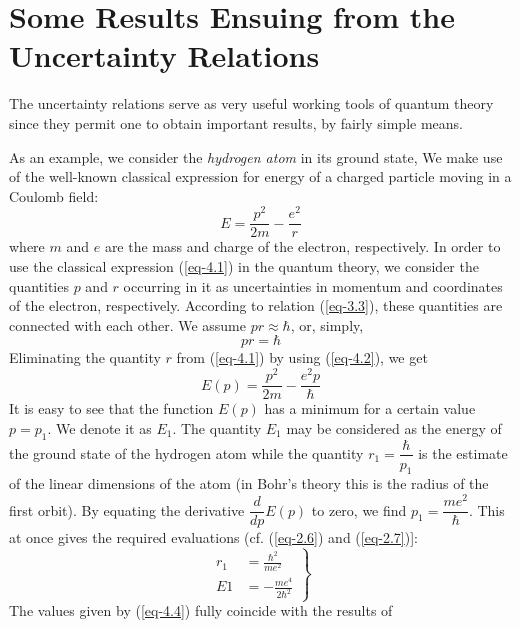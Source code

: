 \documentclass[a4paper,sfsidenotes,colorlinks=true]{tufte-book}
\numberwithin{equation}{section}
\numberwithin{figure}{section}
\begin{document}
\section{Some Results Ensuing from the Uncertainty Relations}
\label{sec-04}
The 
uncertainty relations serve as very useful working tools of quantum
theory since they permit one to obtain important results, by fairly
simple means. 

As an example, we consider the \emph{hydrogen atom} in its ground
state, We make use of the well-known classical expression for energy
of a charged particle moving in a Coulomb field: 
\begin{equation}
E = \frac{p^{2}}{2m} - \frac{e^{2}}{r}
\label{eq-4.1}
\end{equation}
where $m$ and $e$ are the mass and charge of the electron,
respectively. In order to use the classical expression (\ref{eq-4.1}) in the
quantum theory, we consider the quantities $p$ and $r$ occurring in it as
uncertainties in momentum and coordinates of the electron,
respectively. According to relation (\ref{eq-3.3}), these quantities are
connected with each other. We assume  $pr \approx \hbar$, or, simply, 
\begin{equation}%
pr = \hbar
\label{eq-4.2} 
\end{equation}
Eliminating the quantity $r$ from (\ref{eq-4.1}) by using (\ref{eq-4.2}), we get
\begin{equation}%
E(p) = \frac{p^{2}}{2m} - \frac{e^{2}p}{\hbar}
\label{eq-4.3} 
\end{equation}
It is easy to see that the function $E(p)$ has a minimum for a certain
value $p= p_{1}$. We denote it as $E_{1}$. The quantity $E_{1}$ may be
considered as the energy of the ground state of the hydrogen atom
while the quantity $r_{1} = \dfrac{\hbar}{p_{1}}$ is the estimate of
the linear dimensions of the atom (in Bohr's theory this is the radius
of the first orbit). By equating the derivative $\dfrac{d}{dp} E (p)$
to zero, we find $p_{1} = \dfrac{me^{2}}{\hbar}$. This at once gives
the required evaluations (cf. (\ref{eq-2.6}) and (\ref{eq-2.7})]: 
\begin{equation}%
\left.
\begin{split}
r_{1} & = \frac{\hbar^{2}}{me^{2}} \\
E1 &= - \frac{me^{4}}{2 \hbar^{2}} 
\end{split}
\right \}
\label{eq-4.4}
\end{equation}
The values given by (\ref{eq-4.4}) fully coincide with the results of
\end{document}
